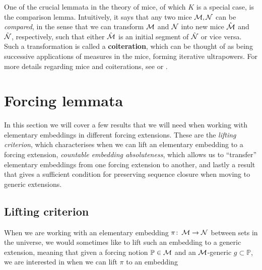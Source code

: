 \documentclass[../../main]{subfiles}
\begin{document}
One of the crucial lemmata in the theory of mice, of which $K$ is a special case, is the comparison lemma. Intuitively, it says that any two mice $\operatorname{\mathcal M},\operatorname{\mathcal N}$ can be \textit{compared}, in the sense that we can transform $\operatorname{\mathcal M}$ and $\operatorname{\mathcal N}$ into new mice $\hat{\operatorname{\mathcal M}}$ and $\hat{\operatorname{\mathcal N}}$, respectively, such that either $\hat{\operatorname{\mathcal M}}$ is an initial segment of $\hat{\operatorname{\mathcal N}}$ or vice versa. Such a transformation is called a \textbf{coiteration}, which can be thought of as being successive applications of measures in the mice, forming iterative ultrapowers. For more details regarding mice and coiterations, see \cite{steel2010outline} or \cite{MSc}.


\section{Forcing lemmata}
\label{prelims.forcing}

In this section we will cover a few results that we will need when working with elementary embeddings in different forcing extensions. These are the \textit{lifting criterion}, which characterises when we can lift an elementary embedding to a forcing extension, \textit{countable embedding absoluteness}, which allows us to ``transfer'' elementary embeddings from one forcing extension to another, and lastly a result that gives a sufficient condition for preserving sequence closure when moving to generic extensions.

\subsection{Lifting criterion}
When we are working with an elementary embedding $\pi\colon\operatorname{\mathcal M}\to\operatorname{\mathcal N}$ between sets in the universe, we would sometimes like to lift such an embedding to a generic extension, meaning that given a forcing notion $\mathbb P\in\operatorname{\mathcal M}$ and an $\operatorname{\mathcal M}$-generic $g\subset\mathbb P$, we are interested in when we can lift $\pi$ to an embedding
\eq{
  \pi^+\colon\M[g]\to\N[h],
}
\end{document}
